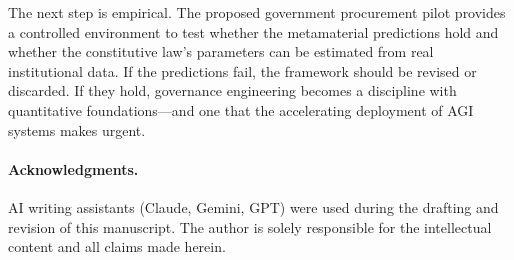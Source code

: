 \documentclass[runningheads]{llncs}
\begin{document}
The next step is empirical. The proposed government procurement pilot provides a controlled environment to test whether the metamaterial predictions hold and whether the constitutive law's parameters can be estimated from real institutional data. If the predictions fail, the framework should be revised or discarded. If they hold, governance engineering becomes a discipline with quantitative foundations---and one that the accelerating deployment of AGI systems makes urgent.

\paragraph{Acknowledgments.} AI writing assistants (Claude, Gemini, GPT) were used during the drafting and revision of this manuscript. The author is solely responsible for the intellectual content and all claims made herein.



\end{document}
